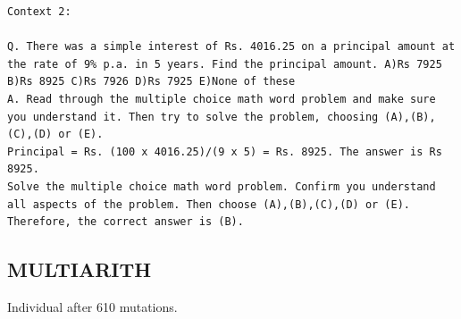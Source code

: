 \documentclass{article} %
\begin{document}
\begin{tcolorbox}
\begin{lstlisting}[escapechar=@]
Context 2:

Q. There was a simple interest of Rs. 4016.25 on a principal amount at the rate of 9% p.a. in 5 years. Find the principal amount. A)Rs 7925 B)Rs 8925 C)Rs 7926 D)Rs 7925 E)None of these
A. Read through the multiple choice math word problem and make sure you understand it. Then try to solve the problem, choosing (A),(B),(C),(D) or (E).
Principal = Rs. (100 x 4016.25)/(9 x 5) = Rs. 8925. The answer is Rs 8925.
Solve the multiple choice math word problem. Confirm you understand all aspects of the problem. Then choose (A),(B),(C),(D) or (E).
Therefore, the correct answer is (B).
\end{lstlisting}
\end{tcolorbox}


\subsection{MULTIARITH}
Individual after 610 mutations.
\end{document}
